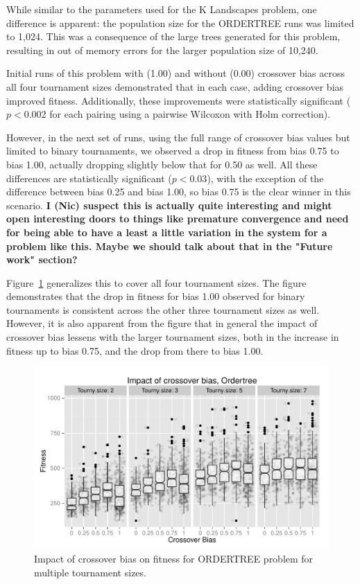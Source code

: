 \documentclass{sig-alternate}
\begin{document}
While similar to the parameters used for the K Landscapes problem, one difference is apparent: the population size for
the ORDERTREE runs was limited to 1,024. This was a consequence of the large trees generated for this problem,
resulting in out of memory errors for the larger population size of 10,240.

Initial runs of this problem with (1.00) and without (0.00) crossover bias across all four tournament sizes
demonstrated that in each case, adding crossover bias improved fitness. Additionally, these improvements were
statistically significant ($p < 0.002$ for each pairing using a pairwise Wilcoxon with Holm correction).

However, in the next set of runs, using the full range of crossover bias values but limited to binary tournaments, we
observed a drop in fitness from bias 0.75 to bias 1.00, actually dropping slightly below that for 0.50 as well. All
these differences are statistically significant ($p < 0.03$), with the exception of the difference between bias 0.25
and bias 1.00, so bias 0.75 is the clear winner in this scenario. \textbf{I (Nic) suspect this is actually quite
interesting and might open interesting doors to things like premature convergence and need for being able to have a
least a little variation in the system for a problem like this. Maybe we should talk about that in the "Future work"
section?}

Figure~\ref{fig:Ordertree_results_all_tournaments_Jan15} generalizes this to cover all four tournament sizes. The
figure demonstrates that the drop in fitness for bias 1.00 observed for binary tournaments is consistent across the
other three tournament sizes as well. However, it is also apparent from the figure that in general the impact of
crossover bias lessens with the larger tournament sizes, both in the increase in fitness up to bias 0.75, and the drop
from there to bias 1.00.

\begin{figure}
\centering
\includegraphics[width=0.45 \textwidth]{Plots/Ordertree_results_all_tournaments_Jan15.pdf}
\caption{Impact of crossover bias on fitness for ORDERTREE problem for multiple tournament sizes.}
\label{fig:Ordertree_results_all_tournaments_Jan15}
\end{figure}
\end{document}
